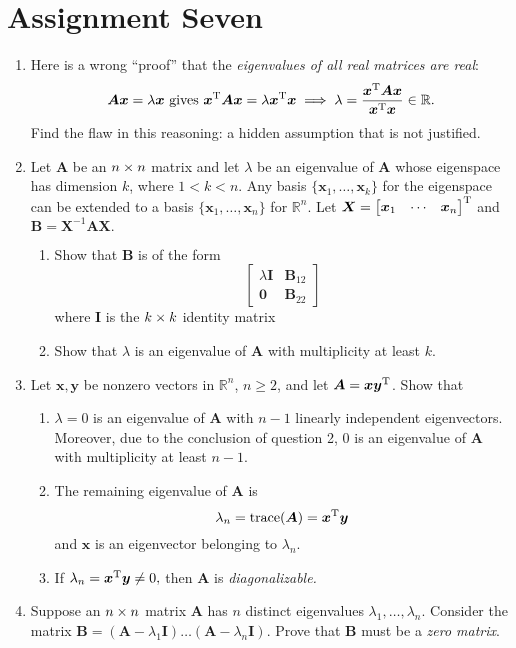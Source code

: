 \section{Assignment Seven}
\begin{enumerate}
\item
Here is a wrong ``proof'' that the \textit{eigenvalues of all real matrices are real}:
\[
\bm{Ax}=\lambda\bm x\text{ gives }\bm x^{\mathrm T}\bm A\bm x=\lambda\bm x^{\mathrm T}\bm x
\implies
\lambda=\frac{\bm x^{\mathrm T}\bm A\bm x}{\bm x^{\mathrm T}\bm x}\in\mathbb{R}.
\]
Find the flaw in this reasoning: a hidden assumption that is not justified.
\item
Let $\bm A$ be an $n\times n$ matrix and let $\lambda$ be an eigenvalue of $\bm A$ whose eigenspace has
dimension $k$, where $1<k<n$. Any basis $\{\bm x_1,\dots,\bm x_k\}$ for the eigenspace can be
extended to a basis $\{\bm x_1,\dots,\bm x_n\}$ for $\mathbb{R}^n$. Let $\bm X=\begin{bmatrix}
\bm x_1&\cdots&\bm x_n
\end{bmatrix}^{\mathrm T}$ and $\bm B=\bm X^{-1}\bm A\bm X.$
\begin{enumerate}
\item
Show that $\bm B$ is of the form
\[
\begin{bmatrix}
\lambda\bm I&\bm B_{12}\\
\bm0&\bm B_{22}
\end{bmatrix}
\]
where $\bm I$ is the $k\times k$ identity matrix
\item
Show that $\lambda$ is an eigenvalue of $\bm A$ with multiplicity at least $k$.
\end{enumerate}
\item
Let $\bm x,\bm y$ be nonzero vectors in $\mathbb{R}^n$, $n\ge2$, and let $\bm A=\bm x\bm y^{\mathrm T}$. Show that
\begin{enumerate}
\item
$\lambda=0$ is an eigenvalue of $\bm A$ with $n-1$ linearly independent eigenvectors. Moreover, due to the conclusion of question 2, $0$ is an eigenvalue of $\bm A$ with multiplicity at least $n-1$.
\item
The remaining eigenvalue of $\bm A$ is
\[
\lambda_n=\operatorname{trace}(\bm A)=\bm x^{\mathrm T}\bm y
\]
and $\bm x$ is an eigenvector belonging to $\lambda_n.$
\item
If $\lambda_n=\bm x^{\mathrm T}\bm y\ne0,$ then $\bm A$ is \textit{diagonalizable.}
\end{enumerate}
\item
Suppose an $n\times n$ matrix $\bm A$ has $n$ distinct eigenvalues $\lambda_1,\dots,\lambda_n$. Consider the matrix $\bm B=(\bm A-\lambda_1\bm I)\dots(\bm A-\lambda_n\bm I)$. Prove that $\bm B$ must be a \textit{zero matrix}.\\

\end{enumerate}
